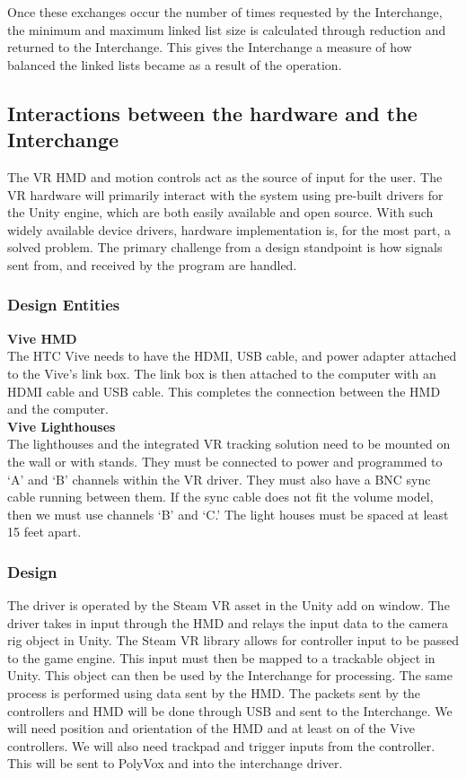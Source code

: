 \documentclass[onecolumn, draftclsnofoot,10pt, compsoc]{IEEEtran}
\begin{document}
Once these exchanges occur the number of times requested by the Interchange, the minimum and maximum linked list size is calculated through reduction and returned to the Interchange. This gives the Interchange a measure of how balanced the linked lists became as a result of the operation.

\subsection{Interactions between the hardware and the Interchange}
The VR HMD and motion controls act as the source of input for the user. The VR hardware will primarily interact with the system using pre-built drivers for the Unity engine, which are both easily available and open source. With such widely available device drivers, hardware implementation is, for the most part, a solved problem. The primary challenge from a design standpoint is how signals sent from, and received by the program are handled.

\subsubsection{Design Entities}
\textbf{Vive HMD} \\
The HTC Vive needs to have the HDMI, USB cable, and power adapter attached to the Vive's link box. The link box is then attached to the computer with an HDMI cable and USB cable. This completes the connection between the HMD and the computer.\\
\textbf{Vive Lighthouses} \\
The lighthouses and the integrated VR tracking solution need to be mounted on the wall or with stands. They must be connected to power and programmed to ‘A’ and ‘B’ channels within the VR driver. They must also have a BNC sync cable running between them. If the sync cable does not fit the volume model, then we must use channels ‘B’ and ‘C.’ The light houses must be spaced at least 15 feet apart. 
\subsubsection{Design} 
The driver is operated by the Steam VR asset in the Unity add on window. The driver takes in input through the HMD and relays the input data to the camera rig object in Unity. The Steam VR library allows for controller input to be passed to the game engine. This input must then be mapped to a trackable object in Unity. This object can then be used by the Interchange for processing. The same process is performed using data sent by the HMD. The packets sent by the controllers and HMD will be done through USB and sent to the Interchange. We will need position and orientation of the HMD and at least on of the Vive controllers. We will also need trackpad and trigger inputs from the controller. This will be sent to PolyVox and into the interchange driver.
\end{document}
